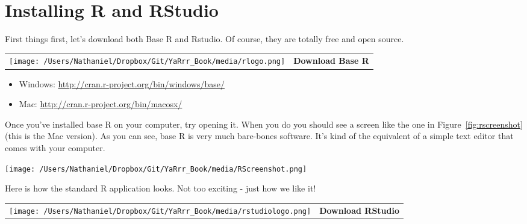 \documentclass{tufte-book}\usepackage[]{graphicx}\usepackage[]{color}
\begin{document}
\break
\section{Installing R and RStudio}

First things first, let's download both Base R and Rstudio. Of course, they are totally free and open source.

\begin{table}[h!]

  \begin{tabular}{  c  c }

    \begin{minipage}{.3\textwidth}
      \texttt{[image: /Users/Nathaniel/Dropbox/Git/YaRrr\_Book/media/rlogo.png]}
    \end{minipage} &
    \textbf{\LARGE{Download Base R}}


  \end{tabular}

\end{table}




\begin{itemize}

\item Windows: \textcolor{blue}{\href{<http://cran.r-project.org/bin/windows/base/>}{http://cran.r-project.org/bin/windows/base/}}
\item Mac: \textcolor{blue}{\href{<http://cran.r-project.org/bin/macosx/>}{http://cran.r-project.org/bin/macosx/}}

\end{itemize}

Once you've installed base R on your computer, try opening it. When you do you should see a screen like the one in Figure~\ref{fig:rscreenshot} (this is the Mac version). As you can see, base R is very much bare-bones software. It's kind of the equivalent of a simple text editor that comes with your computer.

\begin{marginfigure}
\texttt{[image: /Users/Nathaniel/Dropbox/Git/YaRrr\_Book/media/RScreenshot.png]}
\caption{Here is how the standard R application looks. Not too exciting - just how we like it!}
\label{fig:rscreenshot}
\end{marginfigure}



\bigskip


\begin{table}[h!]

  \begin{tabular}{  c  c }

    \begin{minipage}{.3\textwidth}
      \texttt{[image: /Users/Nathaniel/Dropbox/Git/YaRrr\_Book/media/rstudiologo.png]}
    \end{minipage} &
    \textbf{\LARGE{Download RStudio}}


  \end{tabular}

\end{table}
\end{document}
